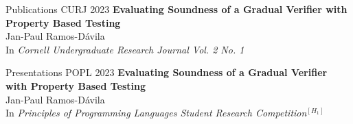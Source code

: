 
\begin{rSection}{Publications}
	\large{CURJ 2023} \phantom{} \hspace{3.5mm} \textbf{Evaluating Soundness of a Gradual Verifier with Property Based Testing} \href{https://journals.library.cornell.edu/index.php/CURJ/}{\ExternalLink}
	\\ 
	\phantom{} \hspace{2.6cm} \small{Jan-Paul Ramos-D{\'a}vila}\normalsize{}
	\\
	\phantom{} \hspace{2.6cm} \color{darkgray}\small{In \textit{Cornell Undergraduate Research Journal Vol. 2 No. 1}} \color{black}

\end{rSection}

\begin{rSection}{Presentations}
	\large{POPL 2023} \phantom{} \hspace{3.5mm} \textbf{Evaluating Soundness of a Gradual Verifier with Property Based Testing} \href{https://popl23.sigplan.org/details/POPL-2023-student-research-competition/13/Evaluating-Soundness-of-a-Gradual-Verifier-with-Property-Based-Testing}{\ExternalLink} \href{https://www.youtube.com/watch?v=sIIwmw0z2Yg}{\ExternalLink}
	\\ 
	\phantom{} \hspace{2.6cm} \small{Jan-Paul Ramos-D{\'a}vila}\normalsize{} 
	\\
	\phantom{} \hspace{2.6cm} \color{darkgray}\small{In \textit{Principles of Programming Languages Student Research Competition}}$^{[H_1]}$ \color{black}
\end{rSection}
